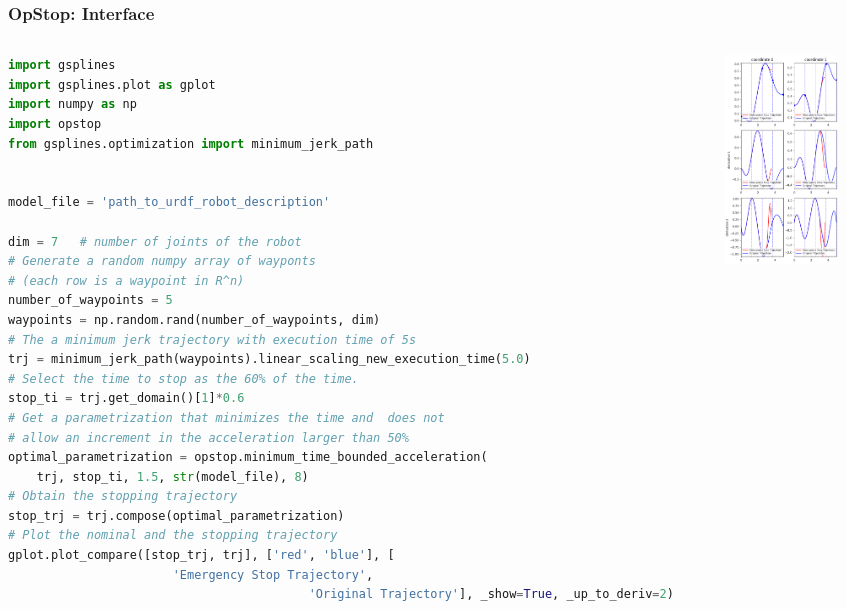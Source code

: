 \begin{frame}[fragile]
	\frametitle{OpStop: Interface}
	\begin{columns}
		\begin{column}{0.4\textwidth}
			\begin{lstlisting}[language=python]
import gsplines
import gsplines.plot as gplot
import numpy as np
import opstop
from gsplines.optimization import minimum_jerk_path


model_file = 'path_to_urdf_robot_description'

dim = 7   # number of joints of the robot
# Generate a random numpy array of wayponts
# (each row is a waypoint in R^n)
number_of_waypoints = 5
waypoints = np.random.rand(number_of_waypoints, dim)
# The a minimum jerk trajectory with execution time of 5s
trj = minimum_jerk_path(waypoints).linear_scaling_new_execution_time(5.0)
# Select the time to stop as the 60% of the time.
stop_ti = trj.get_domain()[1]*0.6
# Get a parametrization that minimizes the time and  does not
# allow an increment in the acceleration larger than 50%
optimal_parametrization = opstop.minimum_time_bounded_acceleration(
    trj, stop_ti, 1.5, str(model_file), 8)
# Obtain the stopping trajectory
stop_trj = trj.compose(optimal_parametrization)
# Plot the nominal and the stopping trajectory
gplot.plot_compare([stop_trj, trj], ['red', 'blue'], [
                       'Emergency Stop Trajectory',
                                          'Original Trajectory'], _show=True, _up_to_deriv=2)
    \end{lstlisting}
		\end{column}
		\begin{column}{0.6\textwidth}
			\includegraphics[width=3cm]{./images/temporal_opstopimage.png}
		\end{column}
	\end{columns}
\end{frame}
